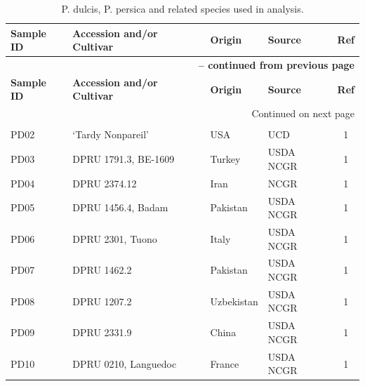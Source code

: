 \documentclass[12pt]{article}
\begin{document}
\begin{center}
\begin{longtable}{llllc}
\caption{P. dulcis, P. persica and related species used in analysis.} \label{sampledetails} \\
\hline \hline
\multicolumn{1}{l}{\textbf{Sample ID}} &
\multicolumn{1}{l}{\textbf{Accession and/or Cultivar}} &
\multicolumn{1}{l}{\textbf{Origin}} &
\multicolumn{1}{l}{\textbf{Source}} &
\multicolumn{1}{c}{\textbf{Ref}}\\
\hline 
\endfirsthead

\multicolumn{5}{r}{{\bfseries \tablename\ \thetable{} -- continued from previous page}} \\
\hline \multicolumn{1}{l}{\textbf{Sample ID}} &
\multicolumn{1}{l}{\textbf{Accession and/or Cultivar}} &
\multicolumn{1}{l}{\textbf{Origin}} &
\multicolumn{1}{l}{\textbf{Source}} &
\multicolumn{1}{c}{\textbf{Ref}} \\ \hline 
\endhead
%
\hline \multicolumn{5}{r}{{Continued on next page}} \\ \hline \hline
\endfoot
%
\endlastfoot
%
	\multicolumn{5}{l}{\emph{P. dulcis}}  \\
	PD02 &‘Tardy Nonpareil’ &USA &UCD &1\\
	PD03 &DPRU 1791.3, BE-1609 &Turkey &USDA NCGR &1\\
	PD04 &DPRU 2374.12 &Iran &NCGR &1\\
	PD05 &DPRU 1456.4, Badam &Pakistan &USDA NCGR &1\\
	PD06 &DPRU 2301, Tuono &Italy &USDA NCGR &1\\
	PD07 &DPRU 1462.2 &Pakistan &USDA NCGR &1\\
	PD08 &DPRU 1207.2 &Uzbekistan &USDA NCGR &1\\
	PD09 &DPRU 2331.9 &China &USDA NCGR &1\\
	PD10 &DPRU 0210, Languedoc &France &USDA NCGR &1\\

\end{longtable}
\end{center}
\end{document}
